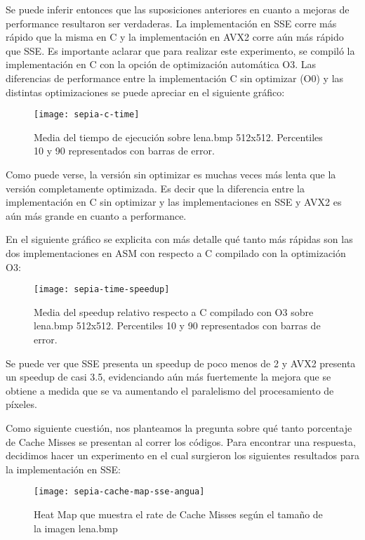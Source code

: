 Se puede inferir entonces que las suposiciones anteriores en cuanto a mejoras de performance resultaron ser verdaderas. La implementación en SSE corre más rápido que la misma en C y la implementación en AVX2 corre aún más rápido que SSE.
Es importante aclarar que para realizar este experimento, se compiló la implementación en C con la opción de optimización automática O3. Las diferencias de performance entre la implementación C sin optimizar (O0) y las distintas optimizaciones se puede apreciar en el siguiente gráfico:

\begin{figure}[h]
    \centering
    \texttt{[image: sepia-c-time]}
    \caption{Media del tiempo de ejecución sobre lena.bmp 512x512. Percentiles 10 y 90 representados con barras de error.}
    \label{fig:sepia-c-time}
\end{figure}

Como puede verse, la versión sin optimizar es muchas veces más lenta que la versión completamente optimizada. Es decir que la diferencia entre la implementación en C sin optimizar y las implementaciones en SSE y AVX2 es aún más grande en cuanto a performance.

En el siguiente gráfico se explicita con más detalle qué tanto más rápidas son las dos implementaciones en ASM con respecto a C compilado con la optimización O3:

\begin{figure}[h]
    \centering
    \texttt{[image: sepia-time-speedup]}
    \caption{Media del speedup relativo respecto a C compilado con O3 sobre lena.bmp 512x512. Percentiles 10 y 90 representados con barras de error.}
    \label{fig:sepia-time-speedup}
\end{figure}

Se puede ver que SSE presenta un speedup de poco menos de 2 y AVX2 presenta un speedup de casi 3.5, evidenciando aún más fuertemente la mejora que se obtiene a medida que se va aumentando el paralelismo del procesamiento de píxeles.

Como siguiente cuestión, nos planteamos la pregunta sobre qué tanto porcentaje de Cache Misses se presentan al correr los códigos. Para encontrar una respuesta, decidimos hacer un experimento en el cual surgieron los siguientes resultados para la implementación en SSE:

\begin{figure}[h]
    \centering
    \texttt{[image: sepia-cache-map-sse-angua]}
    \caption{Heat Map que muestra el rate de Cache Misses según el tamaño de la imagen lena.bmp}
    \label{fig:sepia-cache-map-sse-angua}
\end{figure}

